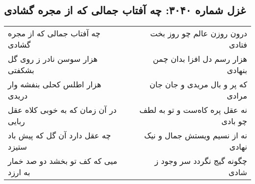 \begin{center}
\section*{غزل شماره ۳۰۴۰: چه آفتاب جمالی که از مجره گشادی}
\label{sec:3040}
\begin{longtable}{l p{0.5cm} r}
چه آفتاب جمالی که از مجره گشادی
&&
درون روزن عالم چو روز بخت فتادی
\\
هزار سوسن نادر ز روی گل بشکفتی
&&
هزار رسم دل افزا بدان چمن بنهادی
\\
هزار اطلس کحلی بنفشه وار دریدی
&&
که پر و بال مریدی و جان جان مرادی
\\
در آن زمان که به خوبی کلاه عقل ربایی
&&
نه عقل پره کاه‌ست و تو به لطف چو بادی
\\
چه عقل دارد آن گل که پیش باد ستیزد
&&
نه از نسیم ویستش جمال و نیک نهادی
\\
میی که کف تو بخشد دو صد خمار به ارزد
&&
چگونه گیج نگردد سر وجود ز شادی
\\
\end{longtable}
\end{center}
